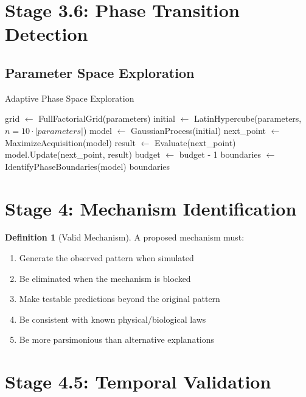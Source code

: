 \documentclass[12pt,oneside]{memoir}
\theoremstyle{plain}
\theoremstyle{definition}
\newtheorem{definition}[theorem]{Definition}
\theoremstyle{remark}
\begin{document}
\section{Stage 3.6: Phase Transition Detection}

\subsection{Parameter Space Exploration}

\begin{algorithm}
\caption{Adaptive Phase Space Exploration}
\begin{algorithmic}[1]
        \State grid $\gets$ FullFactorialGrid(parameters)
    \Else
        \State {}
        \State initial $\gets$ LatinHypercube(parameters, $n=10 \cdot |parameters|$)
        \State model $\gets$ GaussianProcess(initial)
            \State next\_point $\gets$ MaximizeAcquisition(model)
            \State result $\gets$ Evaluate(next\_point)
            \State model.Update(next\_point, result)
            \State budget $\gets$ budget - 1
        \EndWhile
    \EndIf
    \State boundaries $\gets$ IdentifyPhaseBoundaries(model)
    \State \Return boundaries
\EndProcedure
\end{algorithmic}
\end{algorithm}

\section{Stage 4: Mechanism Identification}

\begin{definition}[Valid Mechanism]
A proposed mechanism must:
\begin{enumerate}
\item Generate the observed pattern when simulated
\item Be eliminated when the mechanism is blocked
\item Make testable predictions beyond the original pattern
\item Be consistent with known physical/biological laws
\item Be more parsimonious than alternative explanations
\end{enumerate}
\end{definition}

\section{Stage 4.5: Temporal Validation}
\end{document}
